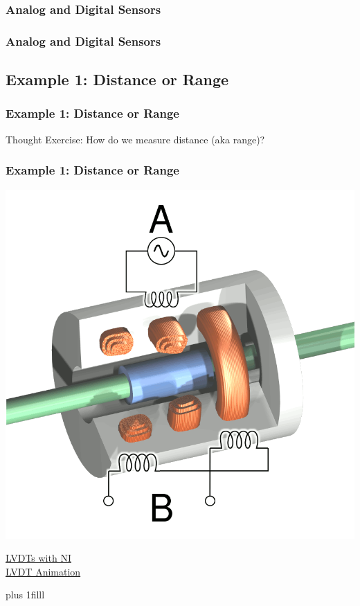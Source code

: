 \documentclass[fleqn]{beamer} %
\newcommand{\sectionIsubsectionIItitle}{Analog and Digital Sensors}
\newcommand{\sectionIsubsectionIIItitle}{Example 1: Distance or Range}
\newcommand{\btVFill}{\vskip0pt plus 1filll}
\begin{document}
			\begin{frame}
				\frametitle{\sectionIsubsectionIItitle}

			\end{frame}

			\begin{frame}
				\frametitle{\sectionIsubsectionIItitle}
		
			\end{frame}


		\subsection{\sectionIsubsectionIIItitle}\label{sectionIsubsectionIII}
			\begin{frame} 
				\frametitle{\sectionIsubsectionIIItitle}
				Thought Exercise: How do we measure distance (aka range)?   
				
			\end{frame}	

			\begin{frame} 
				\frametitle{\sectionIsubsectionIIItitle}

				 \includegraphics[scale=.2]{images/LVDT.png}

			 	\href{https://www.ni.com/en-us/innovations/white-papers/06/measuring-position-and-displacement-with-lvdts.html}{LVDTs with NI}\\
			 	\href{https://www.rdpe.com/us/hiw-lvdt.htm}{LVDT Animation}

			 	\btVFill


			\end{frame}	
\end{document}
